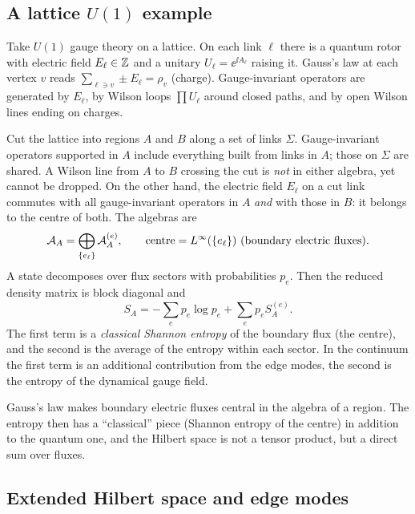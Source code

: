 \subsection{A lattice $U(1)$ example}

Take $U(1)$ gauge theory on a lattice. On each link $\ell$ there is a quantum rotor with electric field $E_\ell\in\mathbb{Z}$ and a unitary $U_\ell=\ee^{\ii A_\ell}$ raising it. Gauss's law at each vertex $v$ reads $\sum_{\ell\ni v}\pm E_\ell=\rho_v$ (charge). Gauge-invariant operators are generated by $E_\ell$, by Wilson loops $\prod U_\ell$ around closed paths, and by open Wilson lines ending on charges.

Cut the lattice into regions $A$ and $B$ along a set of links $\Sigma$. Gauge-invariant operators supported in $A$ include everything built from links in $A$; those on $\Sigma$ are shared. A Wilson line from $A$ to $B$ crossing the cut is \emph{not} in either algebra, yet cannot be dropped. On the other hand, the electric field $E_\ell$ on a cut link commutes with all gauge-invariant operators in $A$ \emph{and} with those in $B$: it belongs to the centre of both. The algebras are
\begin{equation}
\A_A=\bigoplus_{\{e_\ell\}}\A_A^{(e)},\qquad\text{centre}=\Linf(\{e_\ell\})\ \text{(boundary electric fluxes)}.
\end{equation}
A state decomposes over flux sectors with probabilities $p_e$. Then the reduced density matrix is block diagonal and
\begin{equation}
S_A=-\sum_ep_e\log p_e+\sum_ep_eS_A^{(e)}.
\end{equation}
The first term is a \emph{classical Shannon entropy} of the boundary flux (the centre), and the second is the average of the entropy within each sector. In the continuum the first term is an additional contribution from the edge modes, the second is the entropy of the dynamical gauge field.

\begin{keyidea}
Gauss's law makes boundary electric fluxes central in the algebra of a region. The entropy then has a ``classical'' piece (Shannon entropy of the centre) in addition to the quantum one, and the Hilbert space is not a tensor product, but a direct sum over fluxes.
\end{keyidea}

\subsection{Extended Hilbert space and edge modes}

